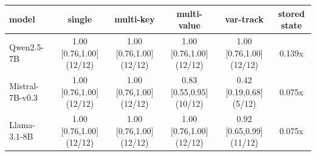 \begin{tabular}{lccccc}
\toprule
model & single & multi-key & multi-value & var-track & stored state \\
\midrule
Qwen2.5-7B & 1.00 [0.76,1.00] (12/12) & 1.00 [0.76,1.00] (12/12) & 1.00 [0.76,1.00] (12/12) & 1.00 [0.76,1.00] (12/12) & 0.139x \\
Mistral-7B-v0.3 & 1.00 [0.76,1.00] (12/12) & 1.00 [0.76,1.00] (12/12) & 0.83 [0.55,0.95] (10/12) & 0.42 [0.19,0.68] (5/12) & 0.075x \\
Llama-3.1-8B & 1.00 [0.76,1.00] (12/12) & 1.00 [0.76,1.00] (12/12) & 1.00 [0.76,1.00] (12/12) & 0.92 [0.65,0.99] (11/12) & 0.075x \\
\bottomrule
\end{tabular}
